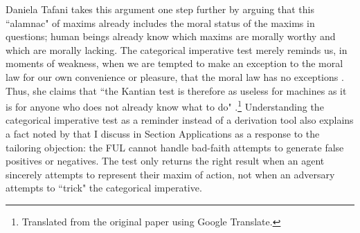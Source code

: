 \begin{isabellebody}
\begin{isamarkuptext}
Daniela Tafani takes this argument one step further by arguing that this ``alamnac" of maxims already 
includes the moral status of the maxims in questions; human beings already
know which maxims are morally worthy and which are morally lacking. The categorical imperative test
merely reminds us, in moments of weakness, when we are tempted to make an exception to the moral law for 
our own convenience or pleasure, that the moral law has no exceptions \citep[9]{tafani}. Thus, she claims
that ``the Kantian test is therefore as useless for machines as it is for anyone who does
not already know what to do" \citep[8]{tafani}.\footnote{Translated from the original paper using Google Translate.} 
Understanding the categorical imperative test as a reminder
instead of a derivation tool also explains a fact noted by \cite{constofreason} that I discuss in Section Applications as a 
response to the tailoring objection: the FUL cannot handle bad-faith attempts to generate false
positives or negatives. The test only returns the right result when an agent sincerely attempts to 
represent their maxim of action, not when an adversary attempts to ``trick" the categorical imperative.


\end{isamarkuptext}
\end{isabellebody}
